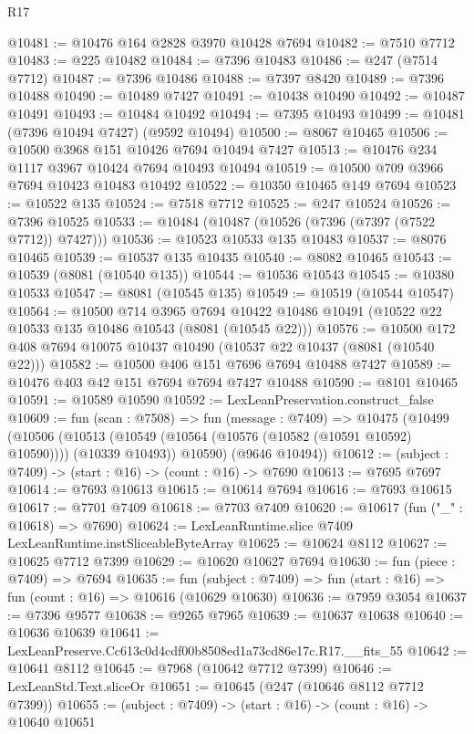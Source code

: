 \begin{lexlean}{R17}
\begin{coremodule}
@10481 := @10476 @164 @2828 @3970 @10428 @7694
@10482 := @7510 @7712
@10483 := @225 @10482
@10484 := @7396 @10483
@10486 := @247 (@7514 @7712)
@10487 := @7396 @10486
@10488 := @7397 @8420
@10489 := @7396 @10488
@10490 := @10489 @7427
@10491 := @10438 @10490
@10492 := @10487 @10491
@10493 := @10484 @10492
@10494 := @7395 @10493
@10499 := @10481 (@7396 @10494 @7427) (@9592 @10494)
@10500 := @8067 @10465
@10506 := @10500 @3968 @151 @10426 @7694 @10494 @7427
@10513 := @10476 @234 @1117 @3967 @10424 @7694 @10493 @10494
@10519 := @10500 @709 @3966 @7694 @10423 @10483 @10492
@10522 := @10350 @10465 @149 @7694
@10523 := @10522 @135
@10524 := @7518 @7712
@10525 := @247 @10524
@10526 := @7396 @10525
@10533 := @10484 (@10487 (@10526 (@7396 (@7397 (@7522 @7712)) @7427)))
@10536 := @10523 @10533 @135 @10483
@10537 := @8076 @10465
@10539 := @10537 @135 @10435
@10540 := @8082 @10465
@10543 := @10539 (@8081 (@10540 @135))
@10544 := @10536 @10543
@10545 := @10380 @10533
@10547 := @8081 (@10545 @135)
@10549 := @10519 (@10544 @10547)
@10564 := @10500
    @714
    @3965
    @7694
    @10422
    @10486
    @10491
    (@10522 @22 @10533 @135 @10486 @10543 (@8081 (@10545 @22)))
@10576 := @10500 @172 @408 @7694 @10075 @10437 @10490 (@10537 @22 @10437 (@8081 (@10540 @22)))
@10582 := @10500 @406 @151 @7696 @7694 @10488 @7427
@10589 := @10476 @403 @42 @151 @7694 @7694 @7427 @10488
@10590 := @8101 @10465
@10591 := @10589 @10590
@10592 := LexLeanPreservation.construct_false
@10609 := fun (scan : @7508) =>
  fun (message : @7409) =>
  @10475
    (@10499
      (@10506
        (@10513 (@10549 (@10564 (@10576 (@10582 (@10591 @10592) @10590)))) (@10339 @10493))
        @10590)
      (@9646 @10494))
@10612 := (subject : @7409) -> (start : @16) -> (count : @16) -> @7690
@10613 := @7695 @7697
@10614 := @7693 @10613
@10615 := @10614 @7694
@10616 := @7693 @10615
@10617 := @7701 @7409
@10618 := @7703 @7409
@10620 := @10617 (fun ("_" : @10618) => @7690)
@10624 := LexLeanRuntime.slice @7409 LexLeanRuntime.instSliceableByteArray
@10625 := @10624 @8112
@10627 := @10625 @7712 @7399
@10629 := @10620 @10627 @7694
@10630 := fun (piece : @7409) => @7694
@10635 := fun (subject : @7409) => fun (start : @16) => fun (count : @16) => @10616 (@10629 @10630)
@10636 := @7959 @3054
@10637 := @7396 @9577
@10638 := @9265 @7965
@10639 := @10637 @10638
@10640 := @10636 @10639
@10641 := LexLeanPreserve.Cc613c0d4cdf00b8508ed1a73cd86e17c.R17.__fits_55
@10642 := @10641 @8112
@10645 := @7968 (@10642 @7712 @7399)
@10646 := LexLeanStd.Text.sliceOr
@10651 := @10645 (@247 (@10646 @8112 @7712 @7399))
@10655 := (subject : @7409) -> (start : @16) -> (count : @16) -> @10640 @10651

\end{coremodule}
\end{lexlean}
